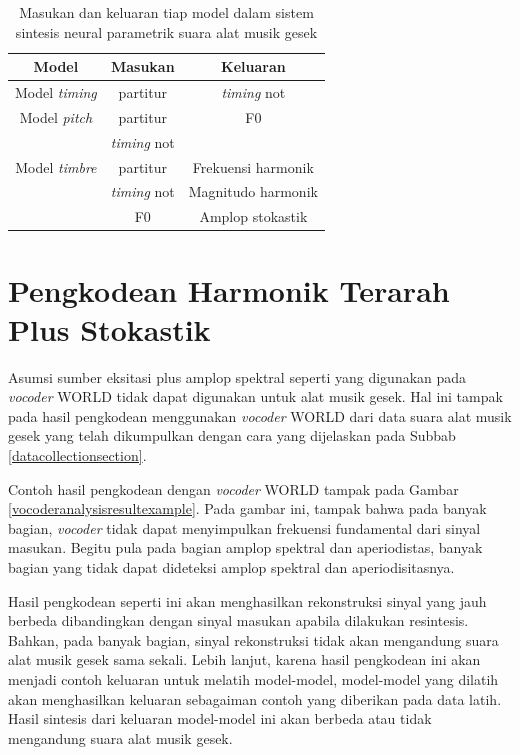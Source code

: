 \begin{table}[h]
    \centering
    \caption{Masukan dan keluaran tiap model dalam sistem sintesis neural parametrik suara alat musik gesek }\label{tab-models-in-out}
    \begin{tabular}{ |c|c|c| } 
     \hline
     Model & Masukan & Keluaran \\
     \hline 
     Model \textit{timing} & partitur & \textit{timing} not  \\ 
     \hline
     Model \textit{pitch} & partitur & F0 \\ 
      & \textit{timing} not  & \\ 
     \hline
     Model \textit{timbre} & partitur   & Frekuensi harmonik \\ 
     & \textit{timing} not & Magnitudo harmonik\\
      & F0 & Amplop stokastik\\ 
     \hline
    \end{tabular}
\end{table}

\section{Pengkodean Harmonik Terarah Plus Stokastik}

Asumsi sumber eksitasi plus amplop spektral seperti yang digunakan pada \textit{vocoder} WORLD tidak dapat digunakan untuk alat musik gesek. Hal ini tampak pada hasil pengkodean menggunakan \textit{vocoder} WORLD dari data suara alat musik gesek yang telah dikumpulkan dengan cara yang dijelaskan pada Subbab \ref{datacollectionsection}.

Contoh hasil pengkodean dengan \textit{vocoder} WORLD tampak pada Gambar \ref{vocoderanalysisresultexample}. Pada gambar ini, tampak bahwa pada banyak bagian, \textit{vocoder} tidak dapat menyimpulkan frekuensi fundamental dari sinyal masukan. Begitu pula pada bagian amplop spektral dan aperiodistas, banyak bagian yang tidak dapat dideteksi amplop spektral dan aperiodisitasnya.

Hasil pengkodean seperti ini akan menghasilkan rekonstruksi sinyal yang jauh berbeda dibandingkan dengan sinyal masukan apabila dilakukan resintesis. Bahkan, pada banyak bagian, sinyal rekonstruksi tidak akan mengandung suara alat musik gesek sama sekali. Lebih lanjut, karena hasil pengkodean ini akan menjadi contoh keluaran untuk melatih model-model, model-model yang dilatih akan menghasilkan keluaran sebagaiman contoh yang diberikan pada data latih. Hasil sintesis dari keluaran model-model ini akan berbeda atau tidak mengandung suara alat musik gesek.

